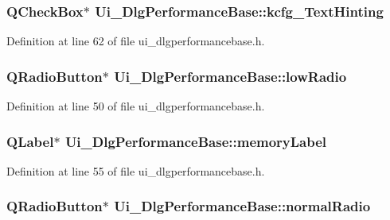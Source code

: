 \hypertarget{classUi__DlgPerformanceBase_a74b774561fae047471009b814b7e7f86}{
\subsubsection[{kcfg\+\_\+\+Text\+Hinting}]{\setlength{\rightskip}{0pt plus 5cm}Q\+Check\+Box$\ast$ Ui\+\_\+\+Dlg\+Performance\+Base\+::kcfg\+\_\+\+Text\+Hinting}}\label{classUi__DlgPerformanceBase_a74b774561fae047471009b814b7e7f86}


Definition at line 62 of file ui\+\_\+dlgperformancebase.\+h.

\hypertarget{classUi__DlgPerformanceBase_a061da5609688bcfe645b49acad1a34bc}{
\subsubsection[{low\+Radio}]{\setlength{\rightskip}{0pt plus 5cm}Q\+Radio\+Button$\ast$ Ui\+\_\+\+Dlg\+Performance\+Base\+::low\+Radio}}\label{classUi__DlgPerformanceBase_a061da5609688bcfe645b49acad1a34bc}


Definition at line 50 of file ui\+\_\+dlgperformancebase.\+h.

\hypertarget{classUi__DlgPerformanceBase_af6390efa23e0a86a5e32abea47e8f7bf}{
\subsubsection[{memory\+Label}]{\setlength{\rightskip}{0pt plus 5cm}Q\+Label$\ast$ Ui\+\_\+\+Dlg\+Performance\+Base\+::memory\+Label}}\label{classUi__DlgPerformanceBase_af6390efa23e0a86a5e32abea47e8f7bf}


Definition at line 55 of file ui\+\_\+dlgperformancebase.\+h.

\hypertarget{classUi__DlgPerformanceBase_a3fcb5b781285ca6f62db48988f9ea3a9}{
\subsubsection[{normal\+Radio}]{\setlength{\rightskip}{0pt plus 5cm}Q\+Radio\+Button$\ast$ Ui\+\_\+\+Dlg\+Performance\+Base\+::normal\+Radio}}\label{classUi__DlgPerformanceBase_a3fcb5b781285ca6f62db48988f9ea3a9}


